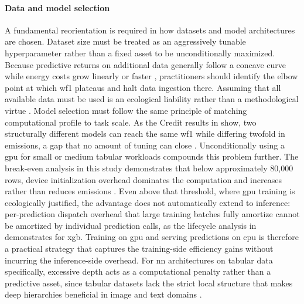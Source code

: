 \paragraph{Data and model selection}
A fundamental reorientation is required in how datasets and model architectures are chosen. Dataset size must be treated as an aggressively tunable hyperparameter rather than a fixed asset to be unconditionally maximized. Because predictive returns on additional data generally follow a concave curve while energy costs grow linearly or faster \cite{koshuteRecommendingTrainingSet2021}, practitioners should identify the elbow point at which \gls{wf1} plateaus and halt data ingestion there. Assuming that all available data must be used is an ecological liability rather than a methodological virtue \cite{verdecchiaDataCentricGreenAI2022a}. Model selection must follow the same principle of matching computational profile to task scale. As the Credit results in  show, two structurally different models can reach the same \gls{wf1} while differing twofold in emissions, a gap that no amount of tuning can close \cite{schwartzGreenAI2020}. Unconditionally using a \gls{gpu} for small or medium tabular workloads compounds this problem further. The break-even analysis in this study demonstrates that below approximately 80{,}000 rows, device initialization overhead dominates the computation and increases rather than reduces emissions \cite{wuSustainableAIEnvironmental2022}. Even above that threshold, where \gls{gpu} training is ecologically justified, the advantage does not automatically extend to inference: per-prediction dispatch overhead that large training batches fully amortize cannot be amortized by individual prediction calls, as the lifecycle analysis in  demonstrates for \gls{xgb}. Training on \gls{gpu} and serving predictions on \gls{cpu} is therefore a practical strategy that captures the training-side efficiency gains without incurring the inference-side overhead. For \gls{nn} architectures on tabular data specifically, excessive depth acts as a computational penalty rather than a predictive asset, since tabular datasets lack the strict local structure that makes deep hierarchies beneficial in image and text domains \cite{grinsztajnWhyTreebasedModels2022a}.

